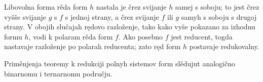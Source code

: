 \documentclass[11pt]{article}
\begin{document}
Libovolna forma rěda form $h$ nastala je črez svijanje $h$ samej s soboju; to jest črez vyšše svijanje $g$ s $f$ s jednoj strany, a črez svijanje $f$ ili $g$ samyh s soboju s drugoj strany. V obojih slučajah rędovo razloženje, tako kako vyše pokazano za izhodnu formu $h$, vodi k polaram rěda form $f$. Ako posebno $f$ jest reducent, togda nastavaje razloženje po polarah reducenta; zato ręd form $h$ postavaje redukovalny.

Priměnjenja teoremy k redukciji polnyh sistemov form slědujut analogično binarnomu i ternarnomu području.
\end{document}
